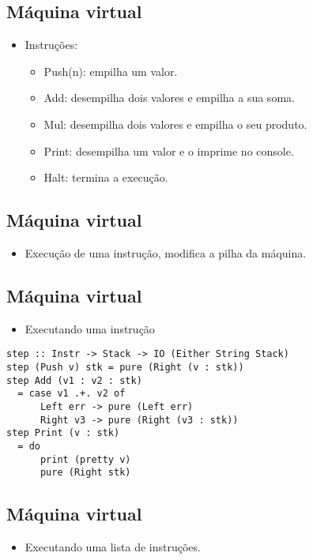 \documentclass[11pt]{article}
\begin{document}
\subsection*{Máquina virtual}
\label{sec:orgc179b63}

\begin{itemize}
\item Instruções:
\begin{itemize}
\item Push(n): empilha um valor.
\item Add: desempilha dois valores e empilha a sua soma.
\item Mul: desempilha dois valores e empilha o seu produto.
\item Print: desempilha um valor e o imprime no console.
\item Halt: termina a execução.
\end{itemize}
\end{itemize}
\subsection*{Máquina virtual}
\label{sec:orgec367df}

\begin{itemize}
\item Execução de uma instrução, modifica a pilha da máquina.
\end{itemize}
\subsection*{Máquina virtual}
\label{sec:org6f3b4de}

\begin{itemize}
\item Executando uma instrução
\end{itemize}

\begin{verbatim}
step :: Instr -> Stack -> IO (Either String Stack)
step (Push v) stk = pure (Right (v : stk))
step Add (v1 : v2 : stk)
  = case v1 .+. v2 of 
      Left err -> pure (Left err)
      Right v3 -> pure (Right (v3 : stk))
step Print (v : stk)
  = do 
      print (pretty v)
      pure (Right stk) 
\end{verbatim}
\subsection*{Máquina virtual}
\label{sec:orgcbf07a1}

\begin{itemize}
\item Executando uma lista de instruções.
\end{itemize}
\end{document}
